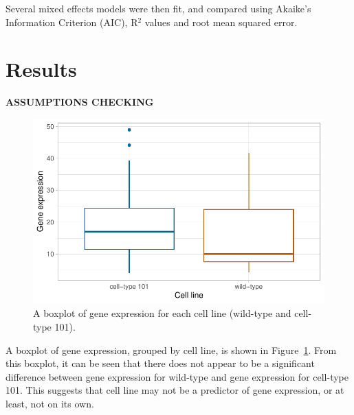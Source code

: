 \documentclass[
  letterpaper,
  DIV=11,
  numbers=noendperiod]{scrartcl}
\begin{document}
Several mixed effects models were then fit, and compared using Akaike's
Information Criterion (AIC), R\(^{2}\) values and root mean squared
error.

\hypertarget{results}{%
\section{Results}\label{results}}

\textbf{ASSUMPTIONS CHECKING}

\begin{figure}

{\centering \includegraphics{2023-05-16_IMRaD-report_AStephenson_files/figure-pdf/fig-ge-cl-boxplot-1.pdf}

}

\caption{\label{fig-ge-cl-boxplot}A boxplot of gene expression for each
cell line (wild-type and cell-type 101).}

\end{figure}

A boxplot of gene expression, grouped by cell line, is shown in
Figure~\ref{fig-ge-cl-boxplot}. From this boxplot, it can be seen that
there does not appear to be a significant difference between gene
expression for wild-type and gene expression for cell-type 101. This
suggests that cell line may not be a predictor of gene expression, or at
least, not on its own.
\end{document}
